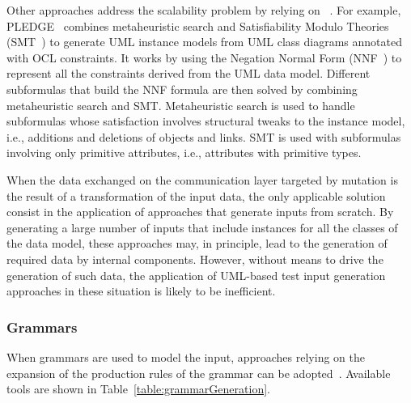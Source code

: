 
Other approaches address the scalability problem by relying on ~\cite{soltana2019practical}.
For example, PLEDGE~\cite{soltana2019practical} combines metaheuristic search and Satisfiability Modulo Theories (SMT~\cite{SMT:2011}) to generate UML instance models from UML class diagrams annotated with OCL constraints. It  works by using the Negation Normal Form (NNF~\cite{NNF:2001}) to represent all the constraints derived from the UML data model. Different subformulas that build the NNF formula are then solved by combining metaheuristic search and SMT. Metaheuristic search is used to handle subformulas whose satisfaction involves structural tweaks to the instance model, i.e., additions and deletions of objects and links. SMT is used with subformulas involving only primitive attributes, i.e., attributes with primitive types. 


When the data exchanged on the communication layer targeted by mutation is the result of a transformation of the input data, the only applicable solution consist in the application of approaches that generate inputs from scratch. By generating a large number of inputs that include instances for all the classes of the data model, these approaches may, in principle, lead to the generation of required data by internal components. However, without means to drive the generation of such data, the application of UML-based test input generation approaches in these situation is likely to be inefficient.


\subsubsection{Grammars}

When grammars are used to model the input,  approaches relying on the expansion of the production rules of the grammar can be adopted~\cite{fuzzingbook2019:GrammarFuzzer}. 
Available tools are shown in Table~\ref{table:grammarGeneration}.

